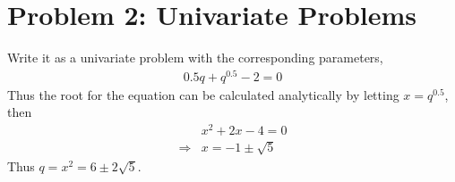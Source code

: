 \section*{Problem 2: Univariate Problems}
Write it as a univariate problem with the corresponding parameters,
\begin{align*}
0.5q+q^{0.5}-2=0
\end{align*}
Thus the root for the equation can be calculated analytically by letting $x=q^{0.5}$, then 
\begin{align*}
&x^{2}+2x-4=0\\
\Rightarrow& x=-1\pm \sqrt{5}
\end{align*}
Thus $q=x^{2}=6\pm2\sqrt{5}$.